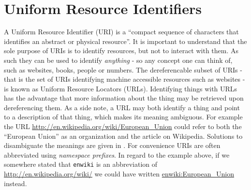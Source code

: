 
\section{Uniform Resource Identifiers}
A Uniform Resource Identifier (URI) is a ``compact sequence of characters
that identifies an abstract or physical resource''\cite{URISpec}.
It is important to understand that the sole purpose of URIs is to
identify resources, but not to interact with them. As such they can be used to
identify \emph{anything} - so any concept one can think of, such as websites,
books, people or numbers. The dereferencable subset of URIs - that is the set
of URIs identifying machine accessible resources such as websites - is
known as Uniform Resource Locators (URLs). Identifying things
with URLs has the advantage that more information about the thing may be retrieved upon
dereferencing them. As a side note, a URL may both identify a thing and point
to a description of that thing, which makes its meaning ambiguous.
For example the URL \url{http://en.wikipedia.org/wiki/European_Union} could
refer to both the ``European Union'' as an organization and the article on Wikipedia.
Solutions to disambiguate the meanings are given in \cite{CoolURIs}.
For convenience URIs are often abbreviated using
\emph{namespace prefixes}. In regard to the example above, if
we somewhere stated that \texttt{enwiki} is an abbreviation of
\url{http://en.wikipedia.org/wiki/} we could have written
\url{enwiki:European_Union} instead.

